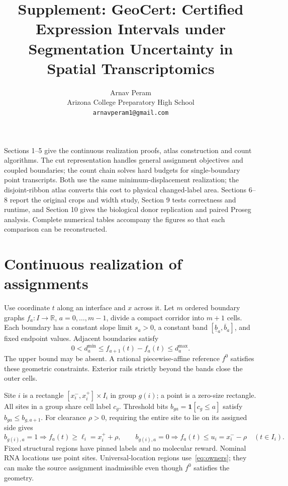 \documentclass[10pt,letterpaper]{article}
\title{Supplement: GeoCert: Certified Expression Intervals under Segmentation Uncertainty in Spatial Transcriptomics}
\author{Arnav Peram\\[2pt]\normalsize Arizona College Preparatory High School\\\normalsize\texttt{arnavperam1@gmail.com}}\date{}
\newcommand{\R}{\mathbb R}
\newcommand{\ind}{\mathbf 1}
\begin{document}
\maketitle
Sections 1--5 give the continuous realization proofs, atlas construction and count algorithms. The cut representation handles general assignment objectives and coupled boundaries; the count chain solves hard budgets for single-boundary point transcripts. Both use the same minimum-displacement realization; the disjoint-ribbon atlas converts this cost to physical changed-label area. Sections 6--8 report the original crops and width study, Section 9 tests correctness and runtime, and Section 10 gives the biological donor replication and paired Proseg analysis. Complete numerical tables accompany the figures so that each comparison can be reconstructed.

\section{Continuous realization of assignments}\label{sec:continuous}
Use coordinate $t$ along an interface and $x$ across it. Let $m$ ordered boundary graphs $f_a:I\to\R$, $a=0,\ldots,m-1$, divide a compact corridor into $m+1$ cells. Each boundary has a constant slope limit $s_a>0$, a constant band $[\underline b_a,\overline b_a]$, and fixed endpoint values. Adjacent boundaries satisfy
\begin{equation}
0<d_a^{\min}\le f_{a+1}(t)-f_a(t)\le d_a^{\max}.\label{eq:gaps}
\end{equation}
The upper bound may be absent. A rational piecewise-affine reference $f^0$ satisfies these geometric constraints. Exterior rails strictly beyond the bands close the outer cells.

Site $i$ is a rectangle $[x_i^-,x_i^+]\times I_i$ in group $g(i)$; a point is a zero-size rectangle. All sites in a group share cell label $c_g$. Threshold bits $b_{ga}=\ind[c_g\le a]$ satisfy $b_{ga}\le b_{g,a+1}$. For clearance $\rho>0$, requiring the entire site to lie on its assigned side gives
\begin{equation}
 b_{g(i),a}=1\Rightarrow f_a(t)\ge \ell_i=x_i^++\rho,\qquad
 b_{g(i),a}=0\Rightarrow f_a(t)\le u_i=x_i^--\rho\quad(t\in I_i).\label{eq:owners}
\end{equation}
Fixed structural regions have pinned labels and no molecular reward. Nominal RNA locations use point sites. Universal-location regions use~\eqref{eq:owners}; they can make the source assignment inadmissible even though $f^0$ satisfies the geometry.
\end{document}
